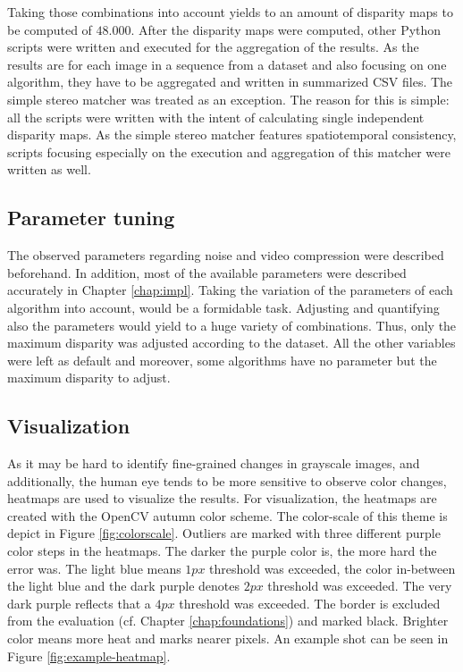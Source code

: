 \newline\newline\noindent Taking those combinations into account yields to an amount of disparity maps to be computed of $48.000$.
After the disparity maps were computed, other Python scripts were written and executed for the aggregation of the results.
As the results are for each image in a sequence from a dataset and also focusing on one algorithm, they have to be aggregated and written in summarized CSV files.
The simple stereo matcher was treated as an exception.
The reason for this is simple: all the scripts were written with the intent of calculating single independent disparity maps.
As the simple stereo matcher features spatiotemporal consistency, scripts focusing especially on the execution and aggregation of this matcher were written as well.

\subsection*{Parameter tuning}

The observed parameters regarding noise and video compression were described beforehand.
In addition, most of the available parameters were described accurately in Chapter \ref{chap:impl}.
Taking the variation of the parameters of each algorithm into account, would be a formidable task.
Adjusting and quantifying also the parameters would yield to a huge variety of combinations.
Thus, only the maximum disparity was adjusted according to the dataset.
All the other variables were left as default and moreover, some algorithms have no parameter but the maximum disparity to adjust.

\subsection*{Visualization}

As it may be hard to identify fine-grained changes in grayscale images, and additionally, the human eye tends to be more sensitive to observe color changes, heatmaps are used to visualize the results.
For visualization, the heatmaps are created with the OpenCV autumn color scheme.
The color-scale of this theme is depict in Figure \ref{fig:colorscale}.
Outliers are marked with three different purple color steps in the heatmaps.
The darker the purple color is, the more hard the error was.
The light blue means $1px$ threshold was exceeded, the color in-between the light blue and the dark purple denotes $2px$ threshold was exceeded.
The very dark purple reflects that a $4px$ threshold was exceeded.
The border is excluded from the evaluation (cf. Chapter \ref{chap:foundations}) and marked black.
Brighter color means more heat and marks nearer pixels.
An example shot can be seen in Figure \ref{fig:example-heatmap}.

